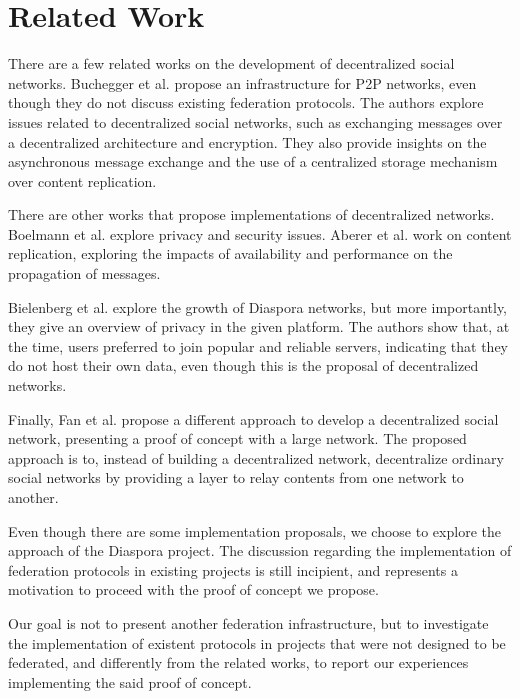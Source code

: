 \chapter{Related Work}
\label{chapter:3}

There are a few related works on the development of decentralized social
networks.
%
Buchegger et al. \cite{p2pInsights2009} propose an infrastructure for P2P
networks, even though they do not discuss existing federation protocols. The
authors explore issues related to decentralized social networks, such as
exchanging messages over a decentralized architecture and encryption.  They
also provide insights on the asynchronous message exchange and the use of a
centralized storage mechanism over content replication.

There are other works that propose implementations of decentralized networks.
Boelmann et al. \cite{sonet2013} explore privacy and security issues. Aberer et
al. \cite{my32012} work on content replication, exploring the impacts of
availability and performance on the propagation of messages.

Bielenberg et al. \cite{diasporaGrowth2012} explore the growth of Diaspora
networks, but more importantly, they give an overview of privacy in the given
platform. The authors show that, at the time, users preferred to join popular
and reliable servers, indicating that they do not host their own data, even
though this is the proposal of decentralized networks.

Finally, Fan et al. \cite{snsapi2014} propose a different approach to develop a
decentralized social network, presenting a proof of concept with a large
network. The proposed approach is to, instead of building a decentralized
network, decentralize ordinary social networks by providing a layer to relay
contents from one network to another.

Even though there are some implementation proposals, we choose to explore the
approach of the Diaspora project. The discussion regarding the implementation
of federation protocols in existing projects is still incipient, and represents a
motivation to proceed with the proof of concept we propose.

Our goal is not to present another federation infrastructure, but to
investigate the implementation of existent protocols in projects that were not
designed to be federated, and differently from the related works, to report our
experiences implementing the said proof of concept.
